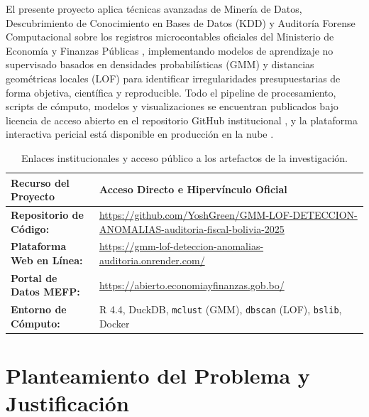 \documentclass[11pt,a4paper]{article}
\begin{document}
El presente proyecto aplica técnicas avanzadas de Minería de Datos, Descubrimiento de Conocimiento en Bases de Datos (KDD) y Auditoría Forense Computacional sobre los registros microcontables oficiales del Ministerio de Economía y Finanzas Públicas \citep{mefp_datosabiertos}, implementando modelos de aprendizaje no supervisado basados en densidades probabilísticas (GMM) y distancias geométricas locales (LOF) para identificar irregularidades presupuestarias de forma objetiva, científica y reproducible. Todo el pipeline de procesamiento, scripts de cómputo, modelos y visualizaciones se encuentran publicados bajo licencia de acceso abierto en el repositorio GitHub institucional \citep{github_proyecto}, y la plataforma interactiva pericial está disponible en producción en la nube \citep{render_dashboard}.

\begin{table}[H]
\centering
\small
\begin{tabularx}{\textwidth}{p{4.2cm}>{\raggedright\arraybackslash}X}
\hline
\textbf{Recurso del Proyecto} & \textbf{Acceso Directo e Hiperv\'inculo Oficial} \\
\hline
\textbf{Repositorio de C\'odigo:} & \url{https://github.com/YoshGreen/GMM-LOF-DETECCION-ANOMALIAS-auditoria-fiscal-bolivia-2025} \\
\textbf{Plataforma Web en L\'inea:} & \url{https://gmm-lof-deteccion-anomalias-auditoria.onrender.com/} \\
\textbf{Portal de Datos MEFP:} & \url{https://abierto.economiayfinanzas.gob.bo/} \\
\textbf{Entorno de C\'omputo:} & R 4.4, DuckDB, \texttt{mclust} (GMM), \texttt{dbscan} (LOF), \texttt{bslib}, Docker \\
\hline
\end{tabularx}
\caption{Enlaces institucionales y acceso p\'ublico a los artefactos de la investigaci\'on.}
\label{tab:enlaces_proyecto}
\end{table}

\section{Planteamiento del Problema y Justificación}
\end{document}
